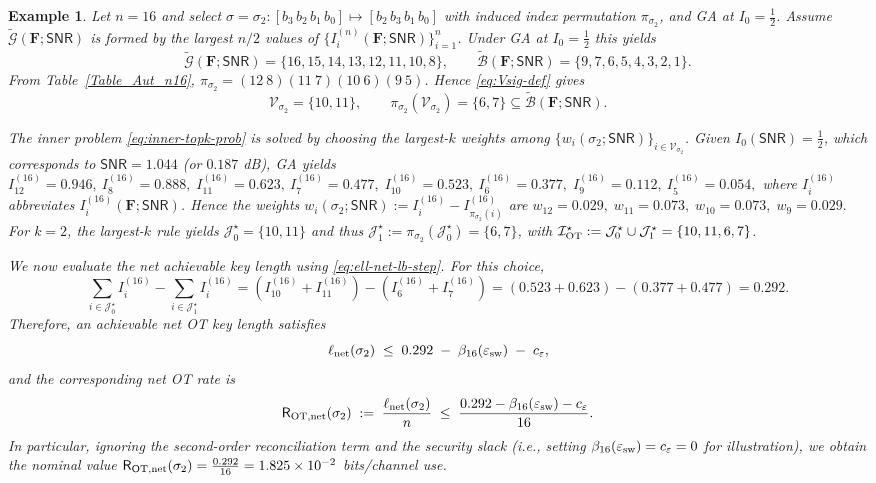 \documentclass[onecolumn]{IEEEtran} %
\newcommand{\bF}{\mathbf F}
\newcommand{\1}{\mathbbm{1}}
\theoremstyle{boldremark}
\newtheorem{example}{Example}
\begin{document}
\begin{example}
Let $n=16$ and select
$\sigma=\sigma_2:[b_3\,b_2\,b_1\,b_0]\mapsto[b_2\,b_3\,b_1\,b_0]$
with induced index permutation $\pi_{\sigma_2}$, and GA at $I_0=\tfrac12$.
Assume $\tilde{\mathcal{G}}(\bF;\textsf{SNR})$ is formed by the largest $n/2$ values of
$\{I_i^{(n)}(\bF;\textsf{SNR})\}_{i=1}^n$. Under GA at $I_0=\tfrac12$ this yields
\[
\tilde{\mathcal{G}}(\bF;\textsf{SNR})=\{16,15,14,13,12,11,10,8\},\qquad
\tilde{\mathcal{B}}(\bF;\textsf{SNR})=\{9,7,6,5,4,3,2,1\}.
\]
From Table~\ref{Table_Aut_n16}, $\pi_{\sigma_2}=(12\ 8)(11\ 7)(10\ 6)(9\ 5)$.
Hence \eqref{eq:Vsig-def} gives
\[
\mathcal{V}_{\sigma_2}=\{10,11\},
\qquad
\pi_{\sigma_2}(\mathcal{V}_{\sigma_2})=\{6,7\}\subseteq\tilde{\mathcal{B}}(\bF;\textsf{SNR}).
\]

The inner problem \eqref{eq:inner-topk-prob} is solved by choosing the largest-$k$ weights among
$\{w_i(\sigma_2;\textsf{SNR})\}_{i\in\mathcal{V}_{\sigma_2}}$.
Given $I_0(\textsf{SNR})=\tfrac12$, which corresponds to $\textsf{SNR}= 1.044$ (or $0.187$ dB),
GA yields
$I_{12}^{(16)}= 0.946,\ I_{8}^{(16)}= 0.888,\;
I_{11}^{(16)}= 0.623,\ I_{7}^{(16)}= 0.477,\;
I_{10}^{(16)}= 0.523,\ I_{6}^{(16)}= 0.377,\;
I_{9}^{(16)}= 0.112,\ I_{5}^{(16)}= 0.054,$
where $I_i^{(16)}$ abbreviates $I_i^{(16)}(\bF;\textsf{SNR})$.
Hence the weights
$w_i(\sigma_2;\textsf{SNR}) := I_i^{(16)}-I_{\pi_{\sigma_2}(i)}^{(16)}$ are
$w_{12}= 0.029,\;w_{11}= 0.073,\;w_{10}= 0.073,\;w_{9}= 0.029.$
For $k=2$, the largest-$k$ rule yields $\mathcal{J}_0^\star=\{10,11\}$ and thus
$\mathcal{J}_1^\star := \pi_{\sigma_2}(\mathcal{J}_0^\star)=\{6,7\}$, with
$\mathcal{I}_{\rm OT}^\star := \mathcal{J}_0^\star\cup\mathcal{J}_1^\star=\{10,11,6,7\}$.

We now evaluate the \emph{net} achievable key length using \eqref{eq:ell-net-lb-step}.
For this choice,
\[
\sum_{i\in\mathcal{J}_0^\star} I_i^{(16)}-\sum_{i\in\mathcal{J}_1^\star} I_i^{(16)}
=
(I_{10}^{(16)}+I_{11}^{(16)})-(I_{6}^{(16)}+I_{7}^{(16)})
=
(0.523+0.623)-(0.377+0.477)
=
0.292.
\]
Therefore, an achievable \emph{net} OT key length satisfies
\[
\ell_{\rm net}(\sigma_2)
\;\le\;
0.292\;-\;\beta_{16}(\varepsilon_{\rm sw})\;-\;c_\varepsilon,
\]
and the corresponding \emph{net} OT rate is
\[
\textsf{R}_{{\rm OT,net}}(\sigma_2)
\;:=\;
\frac{\ell_{\rm net}(\sigma_2)}{n}
\;\le\;
\frac{0.292-\beta_{16}(\varepsilon_{\rm sw})-c_\varepsilon}{16}.
\]
In particular, ignoring the second-order reconciliation term and the security slack
(i.e., setting $\beta_{16}(\varepsilon_{\rm sw})=c_\varepsilon=0$ for illustration),
we obtain the nominal value
$\textsf{R}_{{\rm OT,net}}(\sigma_2)=\frac{0.292}{16}=1.825\times 10^{-2}$ bits/channel use.
\end{example}
\end{document}
